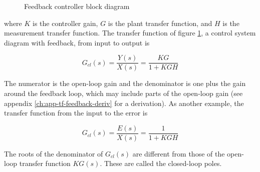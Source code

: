 \begin{figure}[H]
  \centering


  \caption{Feedback controller block diagram}
  \label{fig:feedback_controller_block_diagram}
\end{figure}

where $K$ is the controller gain, $G$ is the plant transfer function, and
$H$ is the measurement transfer function. The transfer function of figure
\ref{fig:feedback_controller_block_diagram}, a control system diagram with
feedback, from input to output is

\begin{equation}
  G_{cl}(s) = \frac{Y(s)}{X(s)} = \frac{KG}{1 + KGH}
\end{equation}

The numerator is the \gls{open-loop gain} and the denominator is one plus the
gain around the feedback loop, which may include parts of the
\gls{open-loop gain} (see appendix \ref{ch:app-tf-feedback-deriv} for a
derivation). As another example, the transfer function from the input to the
error is

\begin{equation}
  G_{cl}(s) = \frac{E(s)}{X(s)} = \frac{1}{1 + KGH}
\end{equation}

The roots of the denominator of $G_{cl}(s)$ are different from those of the
open-loop transfer function $KG(s)$. These are called the closed-loop poles.
